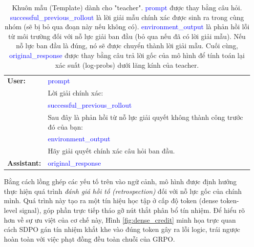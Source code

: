 \documentclass[12pt,a4paper]{report}
\begin{document}
\begin{table}[h!]
\centering
\caption{Khuôn mẫu (Template) dành cho "teacher". \textcolor{blue}{prompt} được thay bằng câu hỏi. \textcolor{blue}{successful\_previous\_rollout} là lời giải mẫu chính xác được sinh ra trong cùng nhóm (sẽ bị bỏ qua đoạn này nếu không có). \textcolor{blue}{environment\_output} là phản hồi lỗi từ môi trường đối với nỗ lực giải ban đầu (bỏ qua nếu đã có lời giải mẫu). Nếu nỗ lực ban đầu là đúng, nó sẽ được chuyển thành lời giải mẫu. Cuối cùng, \textcolor{blue}{original\_response} được thay bằng câu trả lời gốc của mô hình để tính toán lại xác suất (log-probs) dưới lăng kính của teacher.}
\vspace{0.2cm}
\begin{tabular}{lp{12cm}}
\hline
\textbf{User:} & \textcolor{blue}{prompt} \\
& Lời giải chính xác: \\
& \textcolor{blue}{successful\_previous\_rollout} \\
& Sau đây là phản hồi từ nỗ lực giải quyết không thành công trước đó của bạn: \\
& \textcolor{blue}{environment\_output} \\
& Hãy giải quyết chính xác câu hỏi ban đầu. \\
\textbf{Assistant:} & \textcolor{blue}{original\_response} \\
\hline
\end{tabular}
\label{tab:sdpo_template}
\end{table}

Bằng cách lồng ghép các yếu tố trên vào ngữ cảnh, mô hình được định hướng thực hiện quá trình \textit{đánh giá hồi tố (retrospection)} đối với nỗ lực gốc của chính mình. Quá trình này tạo ra một tín hiệu học tập ở cấp độ token (dense token-level signal), góp phần trực tiếp tháo gỡ nút thắt phân bổ tín nhiệm. Để hiểu rõ hơn về sự ưu việt của cơ chế này, Hình \ref{fig:dense_credit} minh họa trực quan cách SDPO gán tín nhiệm khắt khe vào đúng token gây ra lỗi logic, trái ngược hoàn toàn với việc phạt đồng đều toàn chuỗi của GRPO.
\end{document}
